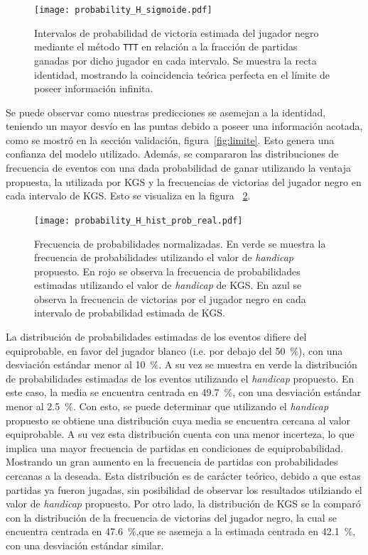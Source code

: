 \documentclass[11pt,twoside,spanish]{report} %
\begin{document}
\begin{figure}[H]
	\centering
	\texttt{[image: probability\_H\_sigmoide.pdf]}
	\caption{Intervalos de probabilidad de victoria estimada del jugador negro  mediante el m\'etodo \texttt{TTT} en relaci\'on a la fracci\'on de partidas ganadas por dicho jugador en cada intervalo. Se muestra la recta identidad, mostrando la coincidencia te\'orica perfecta en el l\'imite de poseer informaci\'on infinita.}
	\label{fig:estimations_H_sigmoide}
\end{figure}


Se puede observar como nuestras predicciones se asemejan a la identidad, teniendo un mayor desv\'io en las puntas  debido a poseer una informaci\'on acotada, como se mostr\'o en la secci\'on validaci\'on, figura~\ref{fig:limite}.
Esto genera una confianza del modelo utilizado.
Adem\'as, se compararon las distribuciones de frecuencia de eventos con una dada probabilidad de ganar utilizando la ventaja propuesta, la utilizada por KGS y  la frecuencias de victorias del jugador negro en cada intervalo de KGS.
Esto se visualiza en la figura ~\ref{fig:estimations_H_hist_prob_real}.


\begin{figure}[H]
	\centering
	\texttt{[image: probability\_H\_hist\_prob\_real.pdf]}
	\caption{Frecuencia de probabilidades normalizadas. En verde se muestra la frecuencia de probabilidades utilizando el valor de \textit{handicap} propuesto. En rojo se observa la frecuencia de probabilidades estimadas utilizando el valor de \textit{handicap} de KGS.  En azul se observa la frecuencia de victorias por el jugador negro en cada intervalo de probabilidad estimada de KGS.}
	\label{fig:estimations_H_hist_prob_real}
\end{figure}

La distribuci\'on de probabilidades estimadas de los eventos difiere del equiprobable, en favor del jugador blanco (i.e. por debajo del \SI{50}{\percent}), con una desviaci\'on est\'andar menor al \SI{10}{\percent}.
A su vez se muestra en verde la distribuci\'on de probabilidades estimadas de los eventos utilizando el \textit{handicap} propuesto.
En este caso, la media se encuentra centrada en \SI{49.7}{\percent}, con una desviaci\'on est\'andar menor al \SI{2.5}{\percent}.
Con esto, se puede determinar que utilizando el \textit{handicap} propuesto se obtiene una distribuci\'on cuya media se encuentra cercana al valor equiprobable.
A su vez esta distribuci\'on cuenta con una menor incerteza, lo que implica una mayor frecuencia de partidas en condiciones de equiprobabilidad.
Mostrando un gran aumento en la frecuencia de partidas con probabilidades cercanas a la deseada.
Esta distribuci\'on es de car\'acter te\'orico, debido a que estas partidas ya fueron jugadas, sin posibilidad de observar los resultados utilziando el valor de \textit{handicap} propuesto.
Por otro lado, la distribuci\'on de KGS se la compar\'o con la distribuci\'on de la frecuencia de victorias del jugador negro, la cual se encuentra centrada en \SI{47.6}{\percent},que se asemeja a la estimada centrada en  \SI{42.1}{\percent}, con una desviaci\'on est\'andar similar.
\end{document}
